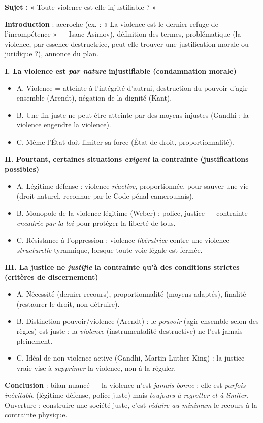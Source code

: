 \documentclass[11pt]{article}
\begin{document}
\begin{exemplebox}
\textbf{Sujet :} « Toute violence est-elle injustifiable ? »

\textbf{Introduction} : accroche (ex. : « La violence est le dernier refuge de l'incompétence » — Isaac Asimov), définition des termes, problématique (la violence, par essence destructrice, peut-elle trouver une justification morale ou juridique ?), annonce du plan.

\textbf{I. La violence est \emph{par nature} injustifiable (condamnation morale)}
\begin{itemize}
\item A. Violence = atteinte à l'intégrité d'autrui, destruction du pouvoir d'agir ensemble (Arendt), négation de la dignité (Kant).
\item B. Une fin juste ne peut être atteinte par des moyens injustes (Gandhi : la violence engendre la violence).
\item C. Même l'État doit limiter sa force (État de droit, proportionnalité).
\end{itemize}

\textbf{II. Pourtant, certaines situations \emph{exigent} la contrainte (justifications possibles)}
\begin{itemize}
\item A. Légitime défense : violence \emph{réactive}, proportionnée, pour sauver une vie (droit naturel, reconnue par le Code pénal camerounais).
\item B. Monopole de la violence légitime (Weber) : police, justice — contrainte \emph{encadrée par la loi} pour protéger la liberté de tous.
\item C. Résistance à l'oppression : violence \emph{libératrice} contre une violence \emph{structurelle} tyrannique, lorsque toute voie légale est fermée.
\end{itemize}

\textbf{III. La justice ne \emph{justifie} la contrainte qu'à des conditions strictes (critères de discernement)}
\begin{itemize}
\item A. Nécessité (dernier recours), proportionnalité (moyens adaptés), finalité (restaurer le droit, non détruire).
\item B. Distinction pouvoir/violence (Arendt) : le \emph{pouvoir} (agir ensemble selon des règles) est juste ; la \emph{violence} (instrumentalité destructive) ne l'est jamais pleinement.
\item C. Idéal de non-violence active (Gandhi, Martin Luther King) : la justice vraie vise à \emph{supprimer} la violence, non à la réguler.
\end{itemize}

\textbf{Conclusion} : bilan nuancé — la violence n'est \emph{jamais bonne} ; elle est \emph{parfois inévitable} (légitime défense, police juste) mais \emph{toujours à regretter et à limiter}. Ouverture : construire une société juste, c'est \emph{réduire au minimum} le recours à la contrainte physique.
\end{exemplebox}
\end{document}

